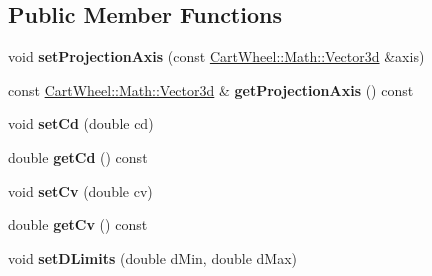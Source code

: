 \subsection*{Public Member Functions}
\begin{DoxyCompactItemize}
\item 
\hypertarget{classCartWheel_1_1Core_1_1LinearBalanceFeedback_a20e6c8d269451b06e6b9fa8e175394d7}{
void {\bfseries setProjectionAxis} (const \hyperlink{classCartWheel_1_1Math_1_1Vector3d}{CartWheel::Math::Vector3d} \&axis)}
\label{classCartWheel_1_1Core_1_1LinearBalanceFeedback_a20e6c8d269451b06e6b9fa8e175394d7}

\item 
\hypertarget{classCartWheel_1_1Core_1_1LinearBalanceFeedback_a2b1feaf53ff7d08303a5baa9b5d667ca}{
const \hyperlink{classCartWheel_1_1Math_1_1Vector3d}{CartWheel::Math::Vector3d} \& {\bfseries getProjectionAxis} () const }
\label{classCartWheel_1_1Core_1_1LinearBalanceFeedback_a2b1feaf53ff7d08303a5baa9b5d667ca}

\item 
\hypertarget{classCartWheel_1_1Core_1_1LinearBalanceFeedback_a2925e1c3ef07871d823bc57abe6d5e2b}{
void {\bfseries setCd} (double cd)}
\label{classCartWheel_1_1Core_1_1LinearBalanceFeedback_a2925e1c3ef07871d823bc57abe6d5e2b}

\item 
\hypertarget{classCartWheel_1_1Core_1_1LinearBalanceFeedback_a7a89fb4c2ddf37442ea91954ddeeaf52}{
double {\bfseries getCd} () const }
\label{classCartWheel_1_1Core_1_1LinearBalanceFeedback_a7a89fb4c2ddf37442ea91954ddeeaf52}

\item 
\hypertarget{classCartWheel_1_1Core_1_1LinearBalanceFeedback_a74806865e7efe9507082db30e3404cf3}{
void {\bfseries setCv} (double cv)}
\label{classCartWheel_1_1Core_1_1LinearBalanceFeedback_a74806865e7efe9507082db30e3404cf3}

\item 
\hypertarget{classCartWheel_1_1Core_1_1LinearBalanceFeedback_a4080d9b5727782c79b7056ed5c7af5d1}{
double {\bfseries getCv} () const }
\label{classCartWheel_1_1Core_1_1LinearBalanceFeedback_a4080d9b5727782c79b7056ed5c7af5d1}

\item 
\hypertarget{classCartWheel_1_1Core_1_1LinearBalanceFeedback_ae173c46785038bd59c7c65b82fef902d}{
void {\bfseries setDLimits} (double dMin, double dMax)}
\label{classCartWheel_1_1Core_1_1LinearBalanceFeedback_ae173c46785038bd59c7c65b82fef902d}


\end{DoxyCompactItemize}
